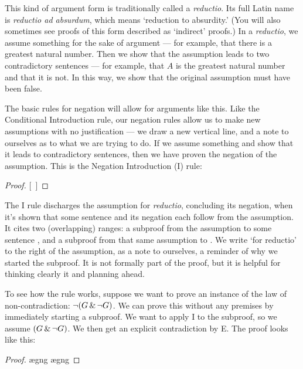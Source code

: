 This kind of argument form is traditionally called a \emph{reductio}. Its full Latin name is \emph{reductio ad absurdum}, which means `reduction to absurdity.' (You will also sometimes see proofs of this form described as `indirect' proofs.) In a \emph{reductio}, we assume something for the sake of argument --- for example, that there is a greatest natural number. Then we show that the assumption leads to two contradictory sentences --- for example, that $A$ is the greatest natural number and that it is not. In this way, we show that the original assumption must have been false.

The basic rules for negation will allow for arguments like this. Like the Conditional Introduction rule, our negation rules allow us to make new assumptions with no justification --- we draw a new vertical line, and a note to ourselves as to what we are trying to do. If we assume something and show that it leads to contradictory sentences, then we have proven the negation of the assumption. This is the Negation Introduction ({\enot}I) rule:

\begin{proof}
\open
	\metaA{}
	\metaB{}
\close
{}[\ ]{\enot\metaA{}}
\end{proof}

The {\enot}I rule discharges the assumption for \emph{reductio}, concluding its negation, when it's shown that some sentence and its negation each follow from the assumption. It cites two (overlapping) ranges: a subproof from the assumption to some sentence \metaB{}, and a subproof from that same assumption to \enot\metaB{}. We write `for reductio' to the right of the assumption, as a note to ourselves, a reminder of why we started the subproof. It is not formally part of the proof, but it is helpful for thinking clearly it and planning ahead.

To see how the rule works, suppose we want to prove an instance of the law of non-contradiction: $\neg(G \,\&\, \neg G)$. We can prove this without any premises by immediately starting a subproof. We want to apply {\enot}I to the subproof, so we assume $(G \,\&\, \neg G)$. We then get an explicit contradiction by {\eand}E. The proof looks like this:

\begin{proof}
	\open
		\ae{gng}
		\ae{gng}
	\close
\end{proof}

